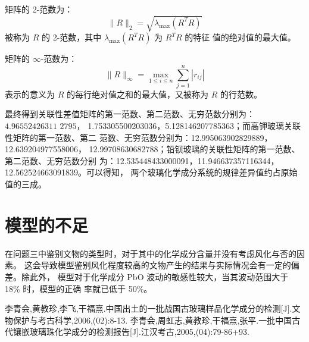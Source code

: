 \documentclass[withoutpreface,bwprint]{cumcmthesis} %
\begin{document}
矩阵的 2-范数为：
\[
    \|R\|_2 = \sqrt{\lambda_{\max}(R^TR)}
\]
\indent 被称为 $R$ 的 2-范数，其中 $\lambda_{\max}(R^TR)$ 为 $R^TR$ 的特征
值的绝对值的最大值。

矩阵的 $\infty$-范数为：
\[
    \|R\|_\infty = \max_{1\leqslant i\leqslant n}\sum_{j=1}^n|r_{ij}|
\]
\indent 表示的意义为 $R$ 的每行绝对值之和的最大值，又被称为 $R$ 的行范数。

最终得到关联性差值矩阵的第一范数、第二范数、无穷范数分别为：$4.96552426311$ $2795$，
 1.753305500203036，5.128146207785363；而高钾玻璃关联性矩阵的第一范数、第二
 范数、无穷范数分别为：12.995063902829889，12.639204977558006，
 12.99708630682788；铅钡玻璃的关联性矩阵的第一范数、第二范数、无穷范数分别
 为：12.535448433000091，11.946637357116344，12.562524663091839。可以得知，
 两个玻璃化学成分系统的规律差异值约占原始值的三成。

 \section{模型的不足}
 在问题三中鉴别文物的类型时，对于其中的化学成分含量并没有考虑风化与否的因素。
 这会导致模型鉴别风化程度较高的文物产生的结果与实际情况会有一定的偏差。除此外，
 模型对于化学成分 PbO 波动的敏感性较大，当其波动范围大于 18\% 时，模型的正确
 率就已低于 50\%。

\begin{thebibliography}{9}
    李青会,黄教珍,李飞,干福熹.中国出土的一批战国古玻璃样品化学成分的检测[J].文物保护与考古科学,2006,(02):8-13.
    李青会,周虹志,黄教珍,干福熹,张平.一批中国古代镶嵌玻璃珠化学成分的检测报告[J].江汉考古,2005,(04):79-86+93.
\end{thebibliography}
\end{document}
